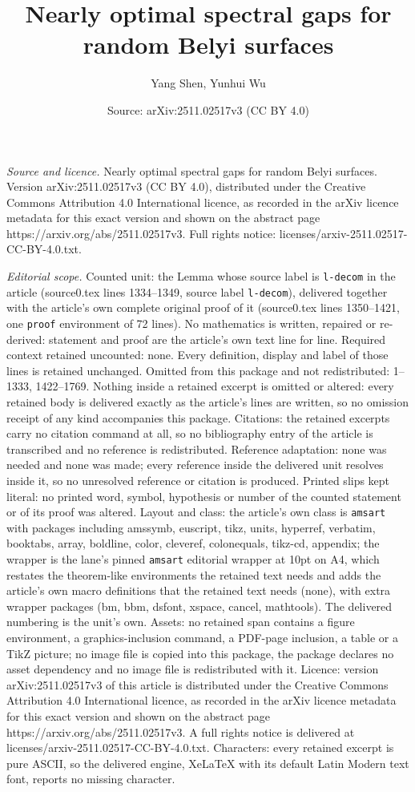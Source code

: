 \documentclass[10pt,a4paper]{amsart}
\title[Nearly optimal spectral gaps for random Belyi surfaces]{Nearly optimal spectral gaps for random Belyi surfaces}
\author{Yang Shen, Yunhui Wu}
\date{Source: arXiv:2511.02517v3 (CC BY 4.0)}
\begin{document}
\maketitle

\noindent\emph{Source and licence.} Nearly optimal spectral gaps for random Belyi surfaces. Version arXiv:2511.02517v3 (CC BY 4.0), distributed under the Creative Commons Attribution 4.0 International licence, as recorded in the arXiv licence metadata for this exact version and shown on the abstract page https://arxiv.org/abs/2511.02517v3. Full rights notice: licenses/arxiv-2511.02517-CC-BY-4.0.txt.\par\smallskip

\noindent\textit{Editorial scope.} Counted unit: the Lemma whose source label is \texttt{l-decom} in the article (source0.tex lines 1334--1349, source label \texttt{l-decom}), delivered together with the article's own complete original proof of it (source0.tex lines 1350--1421, one \texttt{proof} environment of 72 lines). No mathematics is written, repaired or re-derived: statement and proof are the article's own text line for line. Required context retained uncounted: none. Every definition, display and label of those lines is retained unchanged. Omitted from this package and not redistributed: 1--1333, 1422--1769. Nothing inside a retained excerpt is omitted or altered: every retained body is delivered exactly as the article's lines are written, so no omission receipt of any kind accompanies this package. Citations: the retained excerpts carry no citation command at all, so no bibliography entry of the article is transcribed and no reference is redistributed. Reference adaptation: none was needed and none was made; every reference inside the delivered unit resolves inside it, so no unresolved reference or citation is produced. Printed slips kept literal: no printed word, symbol, hypothesis or number of the counted statement or of its proof was altered. Layout and class: the article's own class is \texttt{amsart} with packages including amssymb, euscript, tikz, units, hyperref, verbatim, booktabs, array, boldline, color, cleveref, colonequals, tikz-cd, appendix; the wrapper is the lane's pinned \texttt{amsart} editorial wrapper at 10pt on A4, which restates the theorem-like environments the retained text needs and adds the article's own macro definitions that the retained text needs (none), with extra wrapper packages (bm, bbm, dsfont, xspace, cancel, mathtools). The delivered numbering is the unit's own. Assets: no retained span contains a figure environment, a graphics-inclusion command, a PDF-page inclusion, a table or a TikZ picture; no image file is copied into this package, the package declares no asset dependency and no image file is redistributed with it. Licence: version arXiv:2511.02517v3 of this article is distributed under the Creative Commons Attribution 4.0 International licence, as recorded in the arXiv licence metadata for this exact version and shown on the abstract page https://arxiv.org/abs/2511.02517v3. A full rights notice is delivered at licenses/arxiv-2511.02517-CC-BY-4.0.txt. Characters: every retained excerpt is pure ASCII, so the delivered engine, XeLaTeX with its default Latin Modern text font, reports no missing character.
\end{document}
